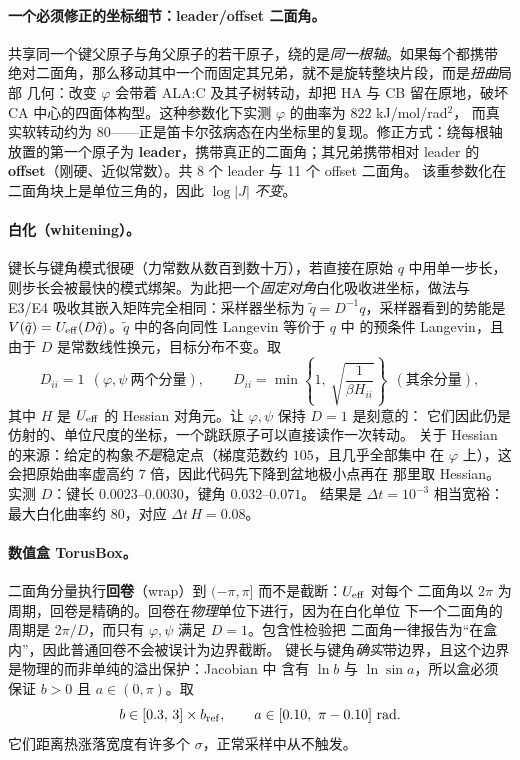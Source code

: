 \documentclass[11pt,a4paper]{article}
\begin{document}
\paragraph{一个必须修正的坐标细节：leader/offset 二面角。}
共享同一个键父原子与角父原子的若干原子，绕的是\emph{同一根轴}。如果每个都携带
绝对二面角，那么移动其中一个而固定其兄弟，就不是旋转整块片段，而是\emph{扭曲}局部
几何：改变 $\varphi$ 会带着 ALA:C 及其子树转动，却把 HA 与 CB 留在原地，破坏 CA
中心的四面体构型。这种参数化下实测 $\varphi$ 的曲率为 $822$ kJ/mol/rad$^2$，
而真实软转动约为 $80$——正是笛卡尔弦病态在内坐标里的复现。修正方式：绕每根轴
放置的第一个原子为 \textbf{leader}，携带真正的二面角；其兄弟携带相对 leader 的
\textbf{offset}（刚硬、近似常数）。共 8 个 leader 与 11 个 offset 二面角。
该重参数化在二面角块上是单位三角的，因此 $\log|J|$ \emph{不变}。

\paragraph{白化（whitening）。}
键长与键角模式很硬（力常数从数百到数十万），若直接在原始 $q$ 中用单一步长，
则步长会被最快的模式绑架。为此把一个\emph{固定对角}白化吸收进坐标，做法与 E3/E4
吸收其嵌入矩阵完全相同：采样器坐标为 $\tilde q=D^{-1}q$，采样器看到的势能是
$V(\tilde q)=U_{\rm eff}(D\tilde q)$。$\tilde q$ 中的各向同性 Langevin 等价于 $q$ 中
的预条件 Langevin，且由于 $D$ 是常数线性换元，目标分布不变。取
\begin{equation}
 D_{ii}=1\ \ (\varphi,\psi\ \text{两个分量}),\qquad
 D_{ii}=\min\!\left\{1,\ \sqrt{\frac{1}{\beta H_{ii}}}\right\}\ \ (\text{其余分量}),
\end{equation}
其中 $H$ 是 $U_{\rm eff}$ 的 Hessian 对角元。让 $\varphi,\psi$ 保持 $D=1$ 是刻意的：
它们因此仍是仿射的、单位尺度的坐标，一个跳跃原子可以直接读作一次转动。
关于 Hessian 的来源：给定的构象\emph{不是}稳定点（梯度范数约 $105$，且几乎全部集中
在 $\varphi$ 上），这会把原始曲率虚高约 $7$ 倍，因此代码先下降到盆地极小点再在
那里取 Hessian。实测 $D$：键长 $0.0023$--$0.0030$，键角 $0.032$--$0.071$。
结果是 $\Delta t=10^{-3}$ 相当宽裕：最大白化曲率约 $80$，对应 $\Delta t\,H=0.08$。

\paragraph{数值盒 TorusBox。}
二面角分量执行\textbf{回卷}（wrap）到 $(-\pi,\pi]$ 而不是截断：$U_{\rm eff}$ 对每个
二面角以 $2\pi$ 为周期，回卷是精确的。回卷在\emph{物理}单位下进行，因为在白化单位
下一个二面角的周期是 $2\pi/D$，而只有 $\varphi,\psi$ 满足 $D=1$。包含性检验把
二面角一律报告为“在盒内”，因此普通回卷不会被误计为边界截断。
键长与键角\emph{确实}带边界，且这个边界是物理的而非单纯的溢出保护：Jacobian 中
含有 $\ln b$ 与 $\ln\sin a$，所以盒必须保证 $b>0$ 且 $a\in(0,\pi)$。取
\begin{equation}
 b\in[0.3,\,3]\times b_{\rm ref},\qquad a\in[0.10,\ \pi-0.10]\ \text{rad}.
\end{equation}
它们距离热涨落宽度有许多个 $\sigma$，正常采样中从不触发。
\end{document}
